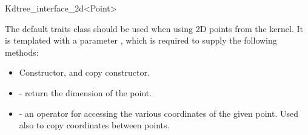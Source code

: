 \begin{ccRefClass}{Kdtree_interface_2d<Point>}

The default traits class  
should be used when using 2D points from the {\cgal} kernel.
It is
templated with a parameter , which is required to
supply the following methods:

\begin{itemize}
    \item Constructor, and copy constructor.

    \item {} - return the dimension of the point.
    
    \item {} - an operator for accessing
    the various coordinates of the given point. Used also to copy
    coordinates between points.
\end{itemize}

\end{ccRefClass}
